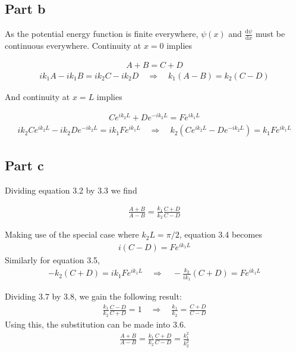 \documentclass[paper=a4, fontsize=11pt]{scrartcl} %
\numberwithin{equation}{section} %
\numberwithin{figure}{section} %
\numberwithin{table}{section} %
\begin{document}
\subsection{Part b}
As the potential energy function is finite everywhere, $\psi(x)$ and $\frac{\mathrm{d}\psi}{\mathrm{d}x}$ must be continuous everywhere. Continuity at $x=0$ implies

\begin{align}
A+B=C+D
\end{align}
\begin{align}
ik_1A-ik_1B=ik_2C-ik_2D \quad \Rightarrow \quad
k_1(A-B) = k_2(C-D)
\end{align}

And continuity at $x=L$ implies

\begin{align}
Ce^{ik_2L}+De^{-ik_2L} = Fe^{ik_1L}
\end{align}
\begin{align}
ik_2Ce^{ik_2L}-ik_2De^{-ik_2L} = ik_1Fe^{ik_1L} \quad
\Rightarrow \quad k_2\left(Ce^{ik_2L}-De^{-ik_2L}\right)
=k_1Fe^{ik_1L}
\end{align}

\subsection{Part c}
Dividing equation 3.2 by 3.3 we find

\begin{align}
\frac{A+B}{A-B} = \frac{k_1}{k_2}\frac{C+D}{C-D}
\end{align}

Making use of the special case where $k_2L = \pi/2$, equation 3.4 becomes
\begin{align}
i(C-D)=Fe^{ik_1L}
\end{align}
Similarly for equation 3.5,
\begin{align}
-k_2(C+D) = ik_1Fe^{ik_1L} \quad \Rightarrow \quad
-\frac{k_2}{ik_1}(C+D) = Fe^{ik_1L}
\end{align}

Dividing 3.7 by 3.8, we gain the following result:
\begin{align}
\frac{k_1}{k_2}\frac{C-D}{C+D} = 1 \quad \Rightarrow \quad
\frac{k_1}{k_2} = \frac{C+D}{C-D}
\end{align}
Using this, the substitution can be made into 3.6.
\begin{align}
\frac{A+B}{A-B} = \frac{k_1}{k_2}\frac{C+D}{C-D} = \frac{k_1^2}{k_2^2}
\end{align}
\end{document}
